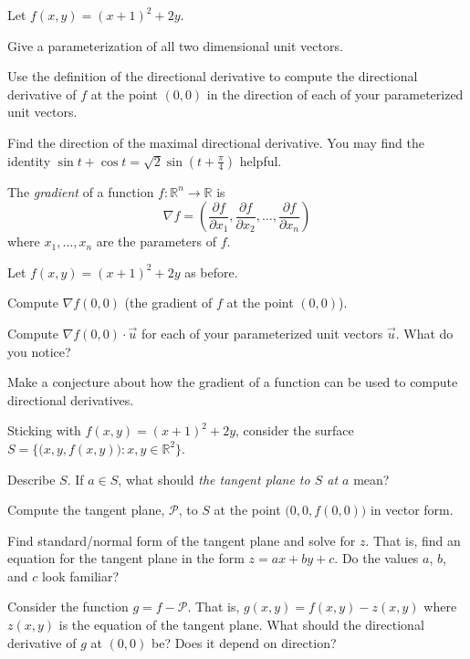\documentclass{problemset}
\newcommand{\R}{\mathbb{R}}
\begin{document}
	\question
	Let $f(x,y) = (x+1)^2+2y$.
	\begin{parts}
		\item Give a parameterization of all two dimensional unit vectors.
		\item Use the definition of the directional derivative to compute
			the directional derivative of $f$ at the point $(0,0)$ in the
			direction of each of your parameterized unit vectors.
		\item Find the direction of the maximal directional derivative.  You
			may find the identity $\sin t+\cos t = \sqrt{2}\sin(t+\tfrac{\pi}{4})$
			helpful.
	\end{parts}

	\begin{definition}[Gradient]
		The \emph{gradient} of a function $f:\R^n\to \R$ is
		\[
			\nabla f  = \left(
				\frac{\partial f}{\partial x_1}, 
				\frac{\partial f}{\partial x_2}, \ldots,
				\frac{\partial f}{\partial x_n}
			\right)
		\]
		where $x_1,\ldots, x_n$ are the parameters of $f$.
	\end{definition}
	
	\question
	Let $f(x,y) = (x+1)^2+2y$ as before.
	\begin{parts}
		\item Compute $\nabla f(0,0)$ (the gradient of $f$ at the point $(0,0)$).
		\item Compute $\nabla f(0,0)\cdot \vec u$ for each of your parameterized unit vectors $\vec u$.
			What do you notice?
		\item Make a conjecture about how the gradient of a function can be used to compute directional derivatives.
	\end{parts}

	\question
	Sticking with $f(x,y) = (x+1)^2+2y$, consider the surface $S=\{\big(x,y,f(x,y)\big):x,y\in\R^2\}$.
	\begin{parts}
		\item Describe $S$.  If $a\in S$, what should \emph{the tangent plane to $S$ at $a$} mean?
		\item Compute the tangent plane, $\mathcal P$, to $S$ at the point $\big(0,0,f(0,0)\big)$ in vector form.
		\item Find standard/normal form of the tangent plane and solve for $z$.  That is,
			find an equation for the tangent plane in the form $z=ax+by+c$.  Do the values $a$, $b$, and
			$c$ look familiar?
		\item Consider the function $g=f-\mathcal P$.  That is, $g(x,y)=f(x,y)-z(x,y)$ where $z(x,y)$ is the
			equation of the tangent plane.  What should the directional derivative of $g$ at $(0,0)$ be?
			Does it depend on direction?
	\end{parts}
\end{document}
